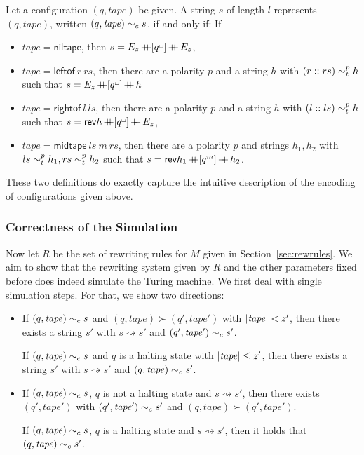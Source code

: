 \documentclass[a4paper,UKenglish,cleveref, autoref]{lipics-v2019}
\newcommand{\strent}{\rightsquigarrow}
\begin{document}
\begin{definition}
  Let a configuration $(q, \mathit{tape})$ be given. A string $s$ of length $l$ represents $(q, \mathit{tape})$, written $(q, \mathit{tape}) \sim_c s$, if and only if: If
  \begin{itemize}
    \item $\mathit{tape} = \textsf{niltape}$, then $s =  E_z \concat [q^\blank] \concat E_z$, 
    \item $\mathit{tape} = \textsf{leftof}~r~rs$, then there are a polarity $p$ and a string $h$ with $(r :: rs) \sim_t^{p} h$ such that $s = E_z \concat [q^\blank] \concat h$
    \item $\mathit{tape} = \textsf{rightof}~l~ls$, then there are a polarity $p$ and a string $h$ with $(l::ls) \sim_t^{p} h$ such that $s = \rev{h} \concat [q^\blank] \concat E_z$, 
    \item $\mathit{tape} = \textsf{midtape}~ls~m~rs$, then there are a polarity $p$ and strings $h_1, h_2$ with $ls \sim_t^{p} h_1, rs \sim_t^{p} h_2$ such that $s = \mathsf{rev}{h_1} \mathop{{+}\!\!\!{+}} [q^m] \mathop{{+}\!\!\!{+}} h_2$. 
  \end{itemize}
\end{definition}

These two definitions do exactly capture the intuitive description of the encoding of configurations given above. 

\subsubsection{Correctness of the Simulation}
Now let $R$ be the set of rewriting rules for $M$ given in Section~\ref{sec:rewrules}. We aim to show that the rewriting system given by $R$ and the other parameters fixed before does indeed simulate the Turing machine. We first deal with single simulation steps. For that, we show two directions:
\begin{itemize}
  \item If $(q, \mathit{tape}) \sim_c s$ and $(q, \mathit{tape}) \succ (q', \mathit{tape}')$ with $|\mathit{tape}| < z'$, then there exists a string $s'$ with $s \strent{} s'$ and $(q', \mathit{tape'}) \sim_c s'$. 

    If $(q, \mathit{tape}) \sim_c s$ and $q$ is a halting state with $|\mathit{tape}| \le z'$, then there exists a string $s'$ with $s \strent{} s'$ and $(q, \mathit{tape}) \sim_c s'$. 
  \item If $(q, \mathit{tape}) \sim_c s$, $q$ is not a halting state and $s \strent{} s'$, then there exists $(q', \mathit{tape}')$ with $(q', \mathit{tape}') \sim_c{} s'$ and $(q, \mathit{tape}) \succ (q', \mathit{tape'})$. 

    If $(q, \mathit{tape}) \sim_c s$, $q$ is a halting state and $s \strent{} s'$, then it holds that $(q, \mathit{tape}) \sim_c{} s'$. 
\end{itemize}
\end{document}
